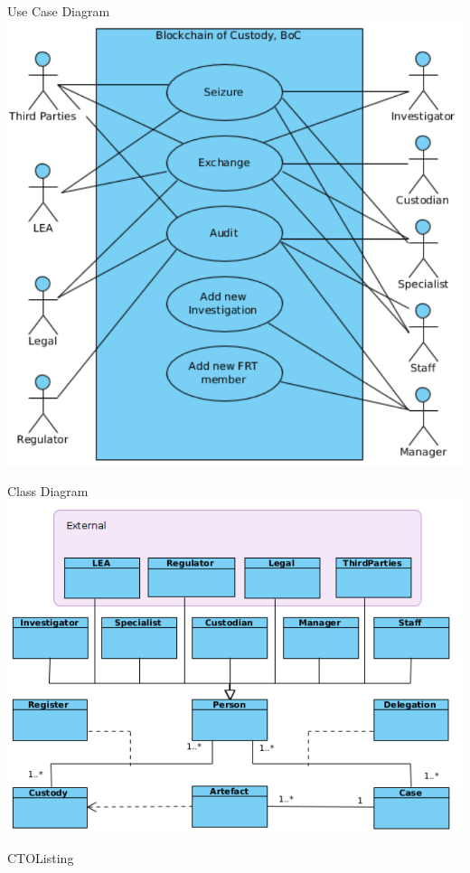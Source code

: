 \documentclass[pdf,table]{beamer}
\begin{document}
\begin{frame}{Use Case Diagram}
	\includegraphics[scale=0.60]{uc6.pdf}
\end{frame}

\begin{frame}{Class Diagram}
	\includegraphics[scale=0.65]{cd6.pdf}
\end{frame}


\begin{frame}{CTO}{Listing}
	
\end{frame}
\end{document}
